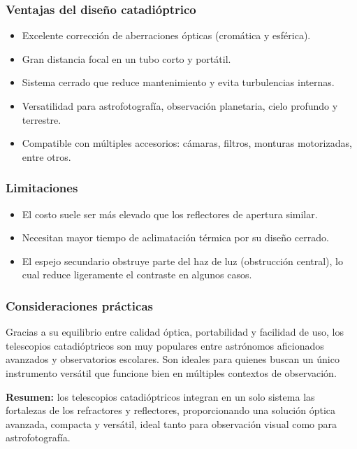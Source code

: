 \subsubsection*{Ventajas del diseño catadióptrico}

\begin{itemize}
	\item Excelente corrección de aberraciones ópticas (cromática y esférica).
	\item Gran distancia focal en un tubo corto y portátil.
	\item Sistema cerrado que reduce mantenimiento y evita turbulencias internas.
	\item Versatilidad para astrofotografía, observación planetaria, cielo profundo y terrestre.
	\item Compatible con múltiples accesorios: cámaras, filtros, monturas motorizadas, entre otros.
\end{itemize}

\subsubsection*{Limitaciones}

\begin{itemize}
	\item El costo suele ser más elevado que los reflectores de apertura similar.
	\item Necesitan mayor tiempo de aclimatación térmica por su diseño cerrado.
	\item El espejo secundario obstruye parte del haz de luz (obstrucción central), lo cual reduce ligeramente el contraste en algunos casos.
\end{itemize}

\subsubsection*{Consideraciones prácticas}

Gracias a su equilibrio entre calidad óptica, portabilidad y facilidad de uso, los telescopios catadióptricos son muy populares entre astrónomos aficionados avanzados y observatorios escolares. Son ideales para quienes buscan un único instrumento versátil que funcione bien en múltiples contextos de observación.

\textbf{Resumen:} los telescopios catadióptricos integran en un solo sistema las fortalezas de los refractores y reflectores, proporcionando una solución óptica avanzada, compacta y versátil, ideal tanto para observación visual como para astrofotografía.
